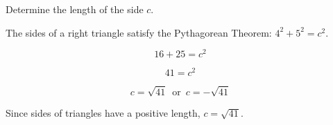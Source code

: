 \documentclass{ximera}
\begin{document}
\begin{example}


Determine the length of the side $c$. 






\begin{image}[3in]
  \end{image}



\begin{explanation}

The sides of a right triangle satisfy the Pythagorean Theorem: $4^2 + 5^2 = c^2$.


\[  16 + 25 = c^2       \]

\[  41 = c^2     \]

\[  c = \sqrt{41} \, \text{ or } \, c = -\sqrt{41}    \]



Since sides of triangles have a positive length, $c = \sqrt{41}$.



\end{explanation}




\end{example}
\end{document}
